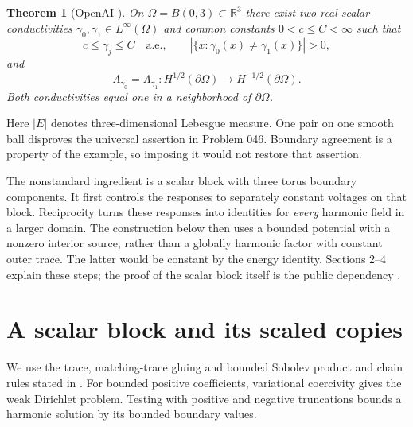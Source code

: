 \documentclass[10pt]{article}
\newtheorem{theorem}{Theorem}
\newcommand{\R}{\mathbb R}
\begin{document}
\begin{theorem}[OpenAI {\cite[Theorem 1.1]{oai}}]\label{thm:main}
On $\Omega=B(0,3)\subset\R^3$ there exist two real scalar conductivities $\gamma_0,\gamma_1\in L^\infty(\Omega)$ and common constants $0<c\leq C<\infty$ such that
\[
c\leq\gamma_j\leq C\quad\text{a.e.},\qquad
|\{x:\gamma_0(x)\ne\gamma_1(x)\}|>0,
\]
and
\[
\Lambda_{\gamma_0}=\Lambda_{\gamma_1}:H^{1/2}(\partial\Omega)\longrightarrow H^{-1/2}(\partial\Omega).
\]
Both conductivities equal one in a neighborhood of $\partial\Omega$.
\end{theorem}
Here $|E|$ denotes three-dimensional Lebesgue measure. One pair on one smooth ball disproves the universal assertion in Problem 046. Boundary agreement is a property of the example, so imposing it would not restore that assertion.

The nonstandard ingredient is a scalar block with three torus boundary components. It first controls the responses to separately constant voltages on that block. Reciprocity turns these responses into identities for \emph{every} harmonic field in a larger domain. The construction below then uses a bounded potential with a nonzero interior source, rather than a globally harmonic factor with constant outer trace. The latter would be constant by the energy identity. Sections 2--4 explain these steps; the proof of the scalar block itself is the public dependency \cite[Sections 3--4]{oai}.

\section{A scalar block and its scaled copies}
We use the trace, matching-trace gluing and bounded Sobolev product and chain rules stated in \cite[Section 2]{oai}. For bounded positive coefficients, variational coercivity gives the weak Dirichlet problem. Testing with positive and negative truncations bounds a harmonic solution by its bounded boundary values.
\end{document}
